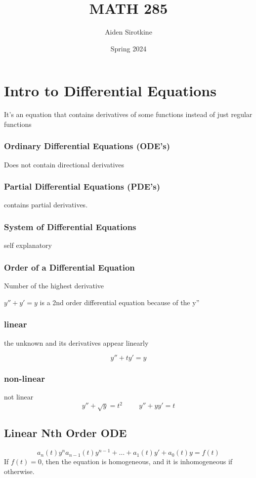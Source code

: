 \documentclass[fleqn]{report}
\date{Spring 2024}
\title{MATH 285}
\author{Aiden Sirotkine}
\newcommand{\hp}{\hspace{1cm}}
\begin{document}
\pagestyle{fancy}
\maketitle
\tableofcontents
\clearpage

\chapter{Intro to Differential Equations}

It's an equation that contains derivatives of some functions instead of just regular functions

\subsection{Ordinary Differential Equations (ODE's)}
Does not contain directional derivatives


\subsection{Partial Differential Equations (PDE's)}
contains partial derivatives.


\subsection{System of Differential Equations}
self explanatory

\subsection{Order of a Differential Equation}
Number of the highest derivative

$
y'' + y' = y
$
is a 2nd order differential equation because of the y''

\subsection{linear}
the unknown and its derivatives appear linearly

\[
y'' + ty' = y
\]

\subsection{non-linear}
not linear
\[
y'' + \sqrt{y} = t^2
\hp
y'' + yy' = t
\]


\section{Linear Nth Order ODE}
\[
a_n(t) y^n a_{n-1}(t)y^{n-1} + \ldots + a_1(t) y' + a_0 (t) y = f(t)
\]
If $f(t) = 0$, then the equation is homogeneous, and it is inhomogeneous if otherwise.
\end{document}
